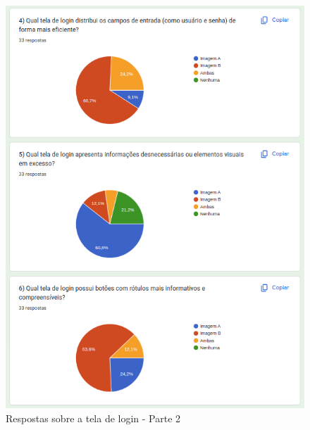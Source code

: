 \begin{figure}[!h]
	\begin{center}
	    \includegraphics[scale=0.7]{figs/Answers/Students/05.png}
	\end{center}
	\caption{\label{APB_TL02}Respostas sobre a tela de login - Parte 2}
\end{figure}

\newpage

